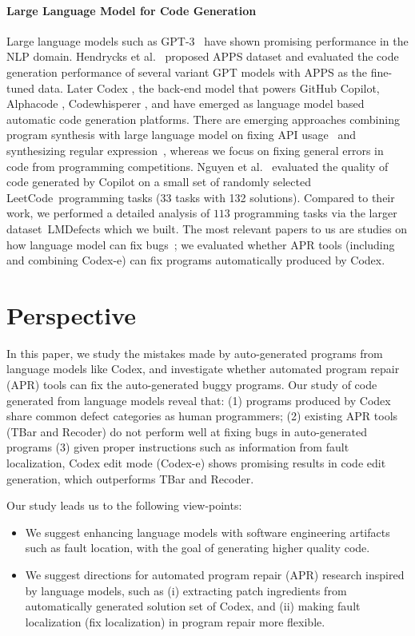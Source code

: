 \paragraph*{Large Language Model for Code Generation} Large language models such as GPT-3~\cite{gpt3} have shown promising performance in the NLP domain. Hendrycks et al.~\cite{apps} proposed APPS dataset and evaluated the code generation performance of several variant GPT models with APPS as the fine-tuned data. Later Codex \cite{codex}, the back-end model that powers GitHub Copilot, Alphacode \cite{alphacode}, Codewhisperer \cite{codew}, and \cite{googlellmsynthesis} have emerged as language model based automatic code generation platforms. There are emerging approaches combining program synthesis with large language model on fixing API usage~\cite{jigsaw} and synthesizing regular expression~\cite{rahmani2021multi}, whereas we focus on fixing general errors in code from programming competitions. Nguyen et al.~\cite{nguyen2022empirical} evaluated the quality of code generated by Copilot on a small set of randomly selected LeetCode~programming tasks (33 tasks with 132 solutions). Compared to their work, we performed a detailed analysis of $113$ programming tasks via the larger dataset~LMDefects which we built. The most relevant papers to us are studies on how language model can fix bugs~\cite{codex_security, codex_apr};  we evaluated whether APR tools (including and combining Codex-e) can fix programs automatically produced by Codex. 

\section{Perspective}

In this paper, we study the mistakes made by auto-generated programs from language models like Codex, and  investigate whether automated program repair (APR) tools  can fix the auto-generated buggy programs. Our study of code generated from language models reveal that: (1) programs produced by Codex share common defect categories as human programmers; (2) existing APR tools (TBar and Recoder) do not perform well at fixing bugs in auto-generated programs (3)  given proper instructions such as information from fault localization, Codex edit mode (Codex-e) shows promising results in code edit generation, which outperforms TBar and Recoder.

Our study leads us to the following view-points:

\begin{itemize}
    \item We suggest enhancing language models with software engineering artifacts such as fault location, with the goal of generating higher quality code.
\item We suggest directions for automated program repair (APR) research inspired by language models, such as (i) extracting patch ingredients from automatically generated solution set of Codex, and (ii) making fault localization (fix localization) in program repair more flexible.
\end{itemize}


